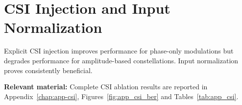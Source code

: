 \section{CSI Injection and Input Normalization}
\label{sec:csi-injection}

Explicit CSI injection improves performance for phase-only modulations but degrades performance for amplitude-based constellations.
Input normalization proves consistently beneficial.

\textbf{Relevant material:}
Complete CSI ablation results are reported in
Appendix~\ref{chap:app-csi},
Figures~\ref{fig:app_csi_ber} and Tables~\ref{tab:app_csi}.